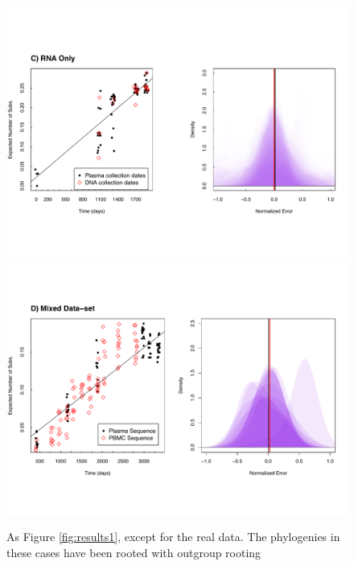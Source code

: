 \documentclass[12pt]{article}
\begin{document}
\begin{figure}[ht]
	\centering
	\includegraphics[width=\textwidth]{figures/ancre.pdf}
	\includegraphics[width=\textwidth]{figures/lanl.pdf}
	\caption[Examples]{As Figure \ref{fig:results1}, except for the real data.
The phylogenies in these cases have been rooted with outgroup rooting}
	\label{fig:results2}
\end{figure}
\end{document}
